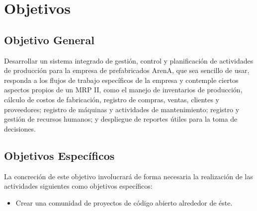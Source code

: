 \section{Objetivos}

\subsection{Objetivo General}

Desarrollar un sistema integrado de gestión, control y planificación de actividades de producción para la empresa de prefabricados ArenA,
que sea sencillo de usar, responda a los flujos de trabajo específicos de la empresa y contemple ciertos aspectos propios de un MRP II,
como el manejo de inventarios de producción, cálculo de costos de fabricación, registro de compras, ventas, clientes y proveedores; registro de máquinas y actividades de mantenimiento; registro y gestión de recursos humanos; y despliegue de reportes útiles para la toma de decisiones.

\subsection{Objetivos Específicos}

La concreción de este objetivo involucrará de forma necesaria la realización de
las actividades siguientes como objetivos específicos:

\begin{itemize}
    \item Crear una comunidad de proyectos de código abierto alrededor de éste.
\end{itemize}